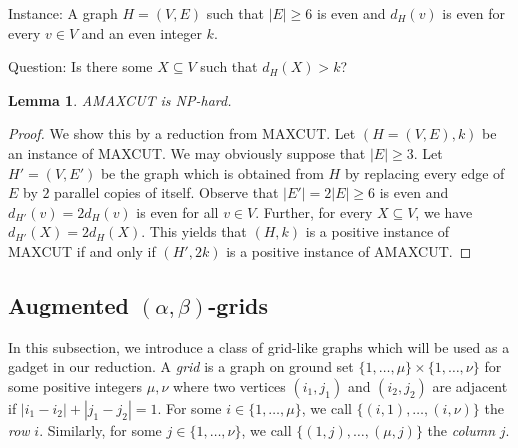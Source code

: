 \documentclass[a4paper,12pt,makeidx]{article}
\newtheorem{lemma}{Lemma}
\begin{document}
\smallskip
\noindent Instance: A graph $H=(V,E)$ such that $|E|\geq 6$ is even and $d_H(v)$ is even for every $v \in V$ and an even integer $k$.

\smallskip
\noindent Question: Is there some $X \subseteq V$ such that $d_H(X) > k$?

\begin{lemma}\label{amax}
AMAXCUT is NP-hard.
\end{lemma}
\begin{proof}
We show this by a reduction from MAXCUT. Let $(H=(V,E),k)$ be an instance of MAXCUT. We may obviously suppose that $|E|\geq 3$. Let $H'=(V,E')$ be the graph which is obtained from $H$ by replacing every edge of $E$ by $2$ parallel copies of itself. Observe that $|E'|=2|E|\geq 6$ is even and $d_{H'}(v)=2d_H(v)$ is even for all $v \in V$. Further, for every $X \subseteq V$, we have $d_{H'}(X)=2d_H(X)$. This yields that $(H,k)$ is a positive instance of MAXCUT if and only if $(H',2k)$ is a positive instance of AMAXCUT.


\end{proof}
\subsection{Augmented $(\alpha,\beta)$-grids}
In this subsection, we introduce a class of grid-like graphs which will be used as  a gadget in our reduction. A {\it grid} is a graph on ground set $\{1,\ldots,\mu\}\times \{1,\ldots,\nu\}$ for some positive integers $\mu,\nu$ where two vertices $(i_1,j_1)$ and $(i_2,j_2)$ are adjacent if $|i_1-i_2|+|j_1-j_2|=1$. For some $i \in \{1,\ldots, \mu\}$, we call $\{(i,1),\ldots, (i,\nu)\}$ the {\it row} $i$. Similarly, for some $j \in \{1,\ldots, \nu\}$, we call $\{(1,j),\ldots, (\mu,j)\}$ the {\it column} $j$.%
\end{document}
